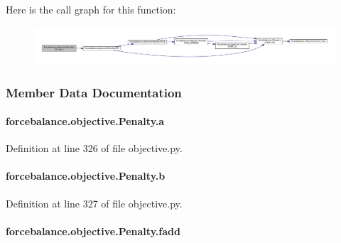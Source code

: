 Here is the call graph for this function\-:
\nopagebreak
\begin{figure}[H]
\begin{center}
\leavevmode
\includegraphics[width=350pt]{classforcebalance_1_1objective_1_1Penalty_ab59d5beafbab0918b7c3e0c61ece41a3_cgraph}
\end{center}
\end{figure}




\subsubsection{Member Data Documentation}
\hypertarget{classforcebalance_1_1objective_1_1Penalty_abab984da8a8f62adbd1decbaf56ac2fa}{
\paragraph[{a}]{\setlength{\rightskip}{0pt plus 5cm}forcebalance.\-objective.\-Penalty.\-a}}\label{classforcebalance_1_1objective_1_1Penalty_abab984da8a8f62adbd1decbaf56ac2fa}


Definition at line 326 of file objective.\-py.

\hypertarget{classforcebalance_1_1objective_1_1Penalty_a0d9da5669d74dfd54a2fc639424e37b6}{
\paragraph[{b}]{\setlength{\rightskip}{0pt plus 5cm}forcebalance.\-objective.\-Penalty.\-b}}\label{classforcebalance_1_1objective_1_1Penalty_a0d9da5669d74dfd54a2fc639424e37b6}


Definition at line 327 of file objective.\-py.

\hypertarget{classforcebalance_1_1objective_1_1Penalty_a8c93cd0cfa455a54f957a061b5f7ac50}{
\paragraph[{fadd}]{\setlength{\rightskip}{0pt plus 5cm}forcebalance.\-objective.\-Penalty.\-fadd}}\label{classforcebalance_1_1objective_1_1Penalty_a8c93cd0cfa455a54f957a061b5f7ac50}


